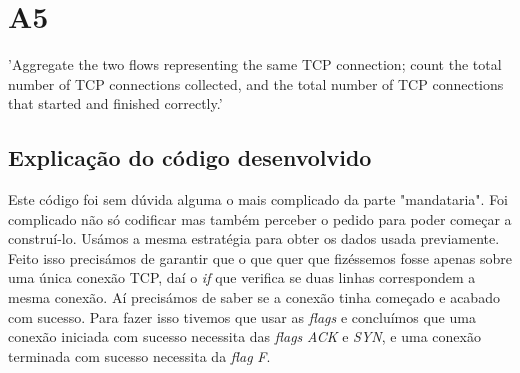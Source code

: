 \chapter{A5}

{\LARGE 'Aggregate the two flows representing the same TCP connection; count the total number of TCP connections collected, and the total number of TCP connections that started and finished correctly.'}

\section{Explicação do código desenvolvido}

Este código foi sem dúvida alguma o mais complicado da parte "mandataria". Foi complicado não só codificar mas também perceber o pedido para poder começar a construí-lo. Usámos a mesma estratégia para obter os dados usada previamente. Feito isso precisámos de garantir que o que quer que fizéssemos fosse apenas sobre uma única conexão TCP, daí o \textit{if} que verifica se duas linhas correspondem a mesma conexão. Aí precisámos de saber se a conexão tinha começado e acabado com sucesso. Para fazer isso tivemos que usar as \textit{flags} e concluímos que uma conexão iniciada com sucesso necessita das \textit{flags} \textit{ACK} e \textit{SYN}, e uma conexão terminada com sucesso necessita da \textit{flag} \textit{F}.

